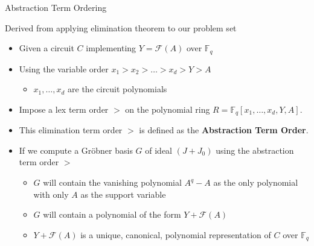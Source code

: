\documentclass[xcolor=dvipsnames]{beamer}
\newcommand{\Fq}{{\mathbb{F}}_{q}}
\newcommand{\F}{{\mathcal{F}}}
\begin{document}

\begin{frame}{\large {Abstraction Term Ordering}}

Derived from applying elimination theorem to our problem set
\begin{itemize}
\item Given a circuit $C$ implementing $Y = \F(A)$ over $\Fq$
\item Using the variable order $x_1 > x_2 > \dots > x_d > Y > A$
	\begin{itemize}
	\item $x_1, \dots ,x_d$ are the circuit polynomials
	\end{itemize}
\item Impose a lex term order $>$ on the polynomial ring $R = \Fq[x_1,
  \dots, x_d, Y, A]$.
\item This elimination term order $>$ is defined as
the {\bf Abstraction Term Order}.

\item If we compute a Gr\"obner basis $G$ of ideal $(J
+ J_0)$ using the abstraction term order $>$
	\begin{itemize}
	\item $G$ will contain the vanishing polynomial $A^q - A$ as the only
	polynomial with only $A$ as the support variable
	\item $G$ will contain a polynomial of the form $Y + \F(A)$
	\item $Y + \F(A)$ is a \alert{unique, canonical, polynomial}
  representation of $C$ over $\Fq$ 
	\end{itemize}
\end{itemize}
\end{frame}

\end{document}
